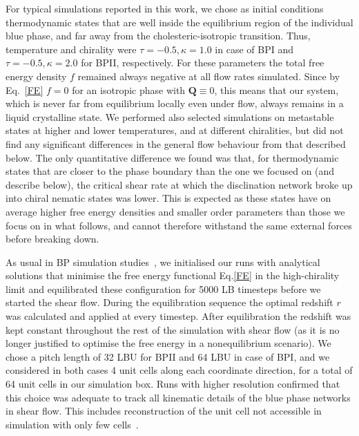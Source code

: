 \documentclass[8.5pt,twoside,twocolumn]{article}
\begin{document}
For typical simulations reported in this work, 
we chose as initial conditions thermodynamic states that are 
well inside the equilibrium region of the individual blue phase, and far away 
from the cholesteric-isotropic transition. Thus, temperature and chirality were 
$\tau=-0.5, \kappa=1.0$ in case of BPI and $\tau=-0.5, \kappa=2.0$ for BPII, respectively.
For these parameters the total free energy density $f$ remained always negative at all flow rates
simulated. 
Since by Eq.~\ref{FE} $f=0$ for an isotropic phase with ${\mathbf Q}\equiv 0$, this means that our system, which is never far from equilibrium locally even under flow, always remains in a liquid crystalline state. 
We performed also selected simulations on metastable states at higher and lower temperatures, 
and at different chiralities, but did not find any significant differences in the 
general flow behaviour from that described below.
The only quantitative difference we found was that, for thermodynamic states that are closer to the phase boundary than the one we focused on (and describe below), the critical shear
rate at which the disclination 
network broke up into chiral nematic states was lower. This is expected as these states have on average higher free energy densities and smaller order parameters than those we focus on in what follows, and cannot therefore withstand the same external forces before breaking down.

As usual in BP simulation studies~\cite{Henrich:2011a,Henrich:2010b}, we initialised our runs with 
analytical solutions that minimise the free energy functional Eq.\ref{FE} in the high-chirality limit 
and equilibrated these configuration for 5000 LB timesteps before we started the shear flow. 
During the equilibration sequence the optimal redshift $r$ was calculated and applied at every timestep.
After equilibration the redshift was kept constant throughout the rest of the simulation with shear flow (as 
it is no longer justified to optimise the free energy in a nonequilibrium scenario).
We chose a pitch length of 32 LBU for BPII and 64 LBU in case of BPI, and we considered in both cases 
4 unit cells along each coordinate direction, for a total of 64 unit cells in our simulation box.
Runs with higher resolution confirmed that this choice was adequate to track  
all kinematic details of the blue phase networks in shear flow. This includes
reconstruction of the unit cell not accessible in simulation with only
few cells~\cite{Dupuis:2005}.
\end{document}
